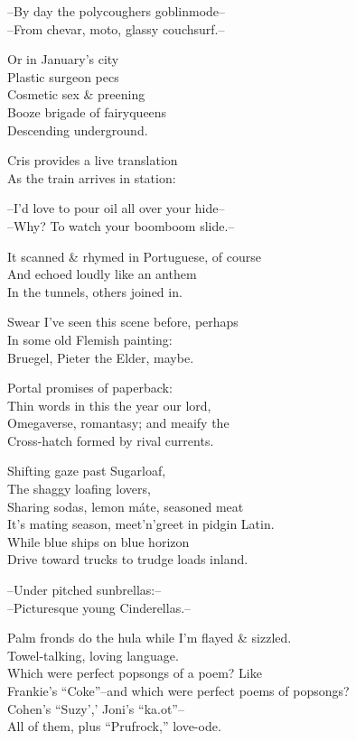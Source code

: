 
--By day the polycoughers goblinmode-- \\
--From chevar, moto, glassy couchsurf.-- 

Or in January's city \\
Plastic surgeon pecs \\
Cosmetic sex \& preening \\
Booze brigade of fairyqueens \\
Descending underground.

Cris provides a live translation \\
As the train arrives in station:

--I'd love to pour oil all over your hide-- \\
--Why? To watch your boomboom slide.--

It scanned \& rhymed in Portuguese, of course \\
And echoed loudly like an anthem \\
In the tunnels, others joined in. 

Swear I've seen this scene before, perhaps \\
In some old Flemish painting: \\
Bruegel, Pieter the Elder, maybe. \\

\secdiv

Portal promises of paperback: \\
Thin words in this the year our lord, \\
Omegaverse, romantasy; and meaify the \\
Cross-hatch formed by rival currents.

Shifting gaze past Sugarloaf, \\
The shaggy loafing lovers, \\
Sharing sodas, lemon máte, seasoned meat \\
It's mating season, meet'n'greet in pidgin Latin. \\
While blue ships on blue horizon \\
Drive toward trucks to trudge loads inland.

--Under pitched sunbrellas:-- \\
--Picturesque young Cinderellas.--

Palm fronds do the hula while I'm flayed \& sizzled. \\
Towel-talking, loving language. \\
Which were perfect popsongs of a poem? Like \\
Frankie's ``Coke''--and which were perfect poems of popsongs? \\
Cohen's ``Suzy',' Joni's ``ka{\textsci}.o{\textupsilon}t''-- \\
All of them, plus ``Prufrock,'' love-ode. \\

